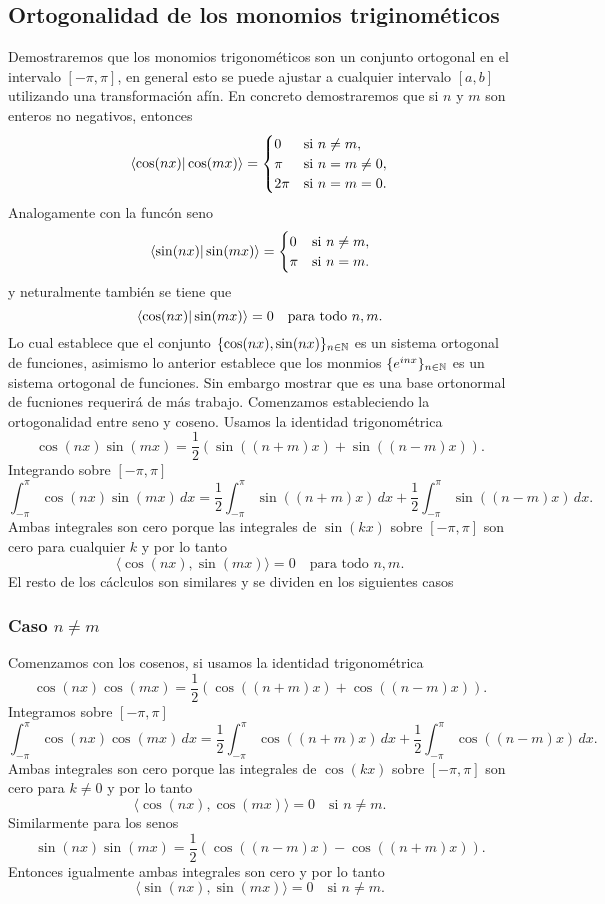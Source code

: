 \documentclass[main.tex]{subfiles}
\begin{document}
\subsection{Ortogonalidad de los monomios triginométicos}
\noindent Demostraremos que los monomios trigonométicos son un conjunto ortogonal en el intervalo \([-\pi,\pi]\), en general esto se puede ajustar a cualquier intervalo \([a,b]\) utilizando una transformación afín. En concreto demostraremos que si \(n\) y \(m\) son enteros no negativos, entonces
\[
\braket{ \cos(nx)| \cos(mx)} =
\begin{cases}
0 & \text{si } n \neq m, \\
\pi & \text{si } n = m \neq 0, \\
2\pi & \text{si } n = m = 0.
\end{cases}
\]
Analogamente con la funcón seno
\[
\braket{\sin(nx)| \sin(mx)} =
\begin{cases}
0 & \text{si } n \neq m, \\
\pi & \text{si } n = m.
\end{cases}
\]
y neturalmente también se tiene que
\[
\braket{\cos(nx) | \sin(mx) }= 0 \quad \text{para todo } n, m.
\]
Lo cual establece que el conjunto \(\{\cos(nx),\sin(nx)\}_{n\in \mathbb N }\) es un sistema ortogonal de funciones, asimismo lo anterior establece que los monmios \(\{e^{inx}\}_{n\in \mathbb N }\) es un sistema ortogonal de funciones. Sin embargo mostrar que es una base ortonormal de fucniones requerirá de más trabajo. Comenzamos  estableciendo la ortogonalidad entre seno y coseno.
Usamos la identidad trigonométrica
\[
\cos(nx) \sin(mx) = \frac{1}{2} \left( \sin((n+m)x) + \sin((n-m)x) \right).
\]
Integrando sobre \([-\pi, \pi]\)
\[
\int_{-\pi}^{\pi} \cos(nx) \sin(mx) \, dx = \frac{1}{2} \int_{-\pi}^{\pi} \sin((n+m)x) \, dx + \frac{1}{2} \int_{-\pi}^{\pi} \sin((n-m)x) \, dx.
\]
Ambas integrales son cero porque las integrales de \(\sin(kx)\) sobre \([-\pi, \pi]\) son cero para cualquier \(k\) y  por lo tanto
\[
\langle \cos(nx), \sin(mx) \rangle = 0 \quad \text{para todo } n, m.
\]
El resto de los cáclculos son similares y se dividen en los siguientes casos
\subsubsection{Caso \(n \neq m\)}
Comenzamos con los cosenos, si usamos la identidad trigonométrica
\[
\cos(nx) \cos(mx) = \frac{1}{2} \left( \cos((n+m)x) + \cos((n-m)x) \right).
\]
Integramos sobre \([-\pi, \pi]\)
\[
\int_{-\pi}^{\pi} \cos(nx) \cos(mx) \, dx = \frac{1}{2} \int_{-\pi}^{\pi} \cos((n+m)x) \, dx + \frac{1}{2} \int_{-\pi}^{\pi} \cos((n-m)x) \, dx.
\]
Ambas integrales son cero porque las integrales de \(\cos(kx)\) sobre \([-\pi, \pi]\) son cero para \(k \neq 0\) y por lo tanto
\[
\langle \cos(nx), \cos(mx) \rangle = 0 \quad \text{si } n \neq m.
\]
Similarmente para los senos
\[
\sin(nx) \sin(mx) = \frac{1}{2} \left( \cos((n-m)x) - \cos((n+m)x) \right).
\]
Entonces igualmente ambas integrales son cero y por lo tanto
\[
\langle \sin(nx), \sin(mx) \rangle = 0 \quad \text{si } n \neq m.
\]
\end{document}
